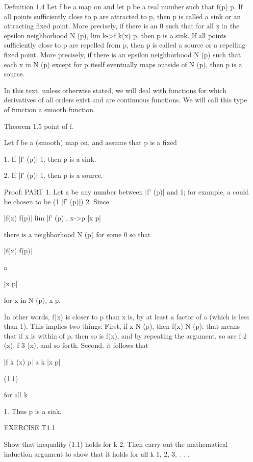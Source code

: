 \documentclass[12pt]{article}
\begin{document}
Definition 1.4 Let f be a map on and let p be a real number such that f(p)  p. If all points sufficiently 
close to p are attracted to p, then p is called a
sink or an attracting fixed point. More precisely, if there is an    0 such that for all x in the epsilon 
neighborhood N  (p), lim k->f k(x)  p, then p is a sink. If all points sufficiently close to p are repelled 
from p, then p is called a source or a repelling fixed point. More precisely, if there is an epsilon 
neighborhood N  (p) such that each x in N  (p) except for p itself eventually maps outside of N  (p), then 
p is a source.

In this text, unless otherwise stated, we will deal with functions for which derivatives of all orders 
exist and are continuous functions. We will call this type of function a smooth function.

Theorem 1.5 point of f.

Let f be a (smooth) map on, and assume that p is a fixed

1. If |f' (p)|   1, then p is a sink.

2. If |f' (p)| 
 1, then p is a source.

Proof: PART 1. Let a be any number between |f' (p)| and 1; for example, a could be chosen to be (1 |f' 
(p)|)  2. Since

|f(x)  f(p)| lim  |f' (p)|, x->p |x  p|

there is a neighborhood N  (p) for some  
 0 so that

|f(x)  f(p)|

 a

|x  p|

for x in N  (p), x p.

In other words, f(x) is closer to p than x is, by at least a factor of a (which is less than 1). This 
implies two things: First, if x  N  (p), then f(x)  N  (p); that means that if x is within  of p, then so 
is f(x), and by repeating the argument, so are f 2 (x), f 3 (x), and so forth. Second, it follows that

|f k (x)  p| a k |x  p|

(1.1)

for all k


 1. Thus p is a sink.

 

EXERCISE T1.1

Show that inequality (1.1) holds for k  2. Then carry out the mathematical induction argument to show that 
it holds for all k  1, 2, 3, . . .
\end{document}
